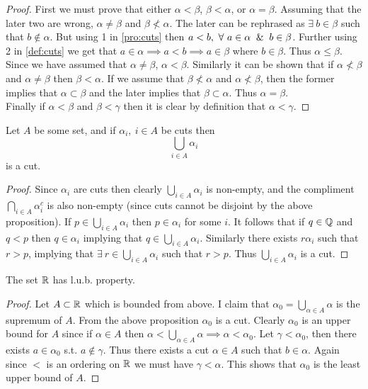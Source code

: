 \begin{proof}
  First we must prove that either $\alpha<\beta$, $\beta<\alpha$, or $\alpha = \beta$. Assuming that the later two are wrong, $\alpha \neq \beta$ and $\beta \nless \alpha$. The later can be rephrased as $\exists\ b\in \beta$ such that $b\notin \alpha$. But using 1 in \cref{pro:cuts} then $a<b,\ \forall\ a\in \alpha \And b\in\beta$. Further using 2 in \cref{def:cuts} we get that $a\in \alpha \implies a<b \implies a\in \beta$ where $b\in \beta$. Thus $\alpha \leq \beta$. Since we have assumed that $\alpha \neq \beta$, $\alpha<\beta$. Similarly it can be shown that if $\alpha \nless \beta$ and $\alpha \neq \beta$ then $\beta < \alpha$. If we assume that $\beta \nless \alpha$ and $\alpha \nless \beta$, then the former implies that $\alpha \subset \beta$ and the later implies that $\beta \subset \alpha$. Thus $\alpha = \beta$.\\

  Finally if $\alpha < \beta$ and $\beta < \gamma$ then it is clear by definition that $\alpha < \gamma$.
\end{proof}
\begin{proposition}
  Let $A$ be some set, and if $\alpha_i,\ i\in A$ be cuts then
  \[\bigcup_{i\in A} \alpha_i\]
  is a cut.
\end{proposition}
\begin{proof}
  Since $\alpha_i$ are cuts then clearly $\bigcup_{i\in A} \alpha_i$ is non-empty, and the compliment $\bigcap_{i\in A} \alpha_i^c$ is also non-empty (since cuts cannot be disjoint by the above proposition). If $p\in \bigcup_{i\in A} \alpha_i$ then $p\in \alpha_i$ for some $i$. It follows that if $q\in \mathbb{Q}$ and $q< p$ then $q\in \alpha_i$ implying that $q\in \bigcup_{i\in A} \alpha_i$. Similarly there exists $r\alpha_i$ such that $r>p$, implying that $\exists\ r\in \bigcup_{i\in A} \alpha_i$ such that $r>p$. Thus $\bigcup_{i\in A} \alpha_i$ is a cut.
\end{proof}
\begin{proposition}\label{pro:lub}
  The set $\mathbb{R}$ has l.u.b. property.
\end{proposition}
\begin{proof}
  Let $A\subset \mathbb{R}$ which is bounded from above. I claim that $\alpha_0 = \bigcup_{\alpha \in A} \alpha$ is the supremum of $A$. From the above proposition $\alpha_0$ is a cut. Clearly $\alpha_0$ is an upper bound for $A$ since if $\alpha\in A$ then $\alpha < \bigcup_{\alpha \in A} \alpha \implies \alpha < \alpha_0$. Let $\gamma < \alpha_0$, then there exists $a\in \alpha_0$ s.t. $a\notin \gamma$. Thus there exists a cut $\alpha\in A$ such that $b\in \alpha$. Again since $<$ is an ordering on $\mathbb{R}$ we must have $\gamma < \alpha$. This shows that $\alpha_0$ is the least upper bound of $A$.
\end{proof}
